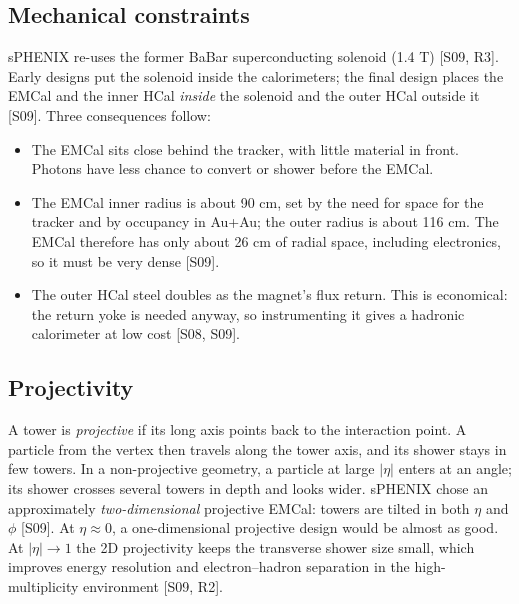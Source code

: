 \documentclass[11pt,letterpaper]{article}
\begin{document}
\subsection{Mechanical constraints}
sPHENIX re-uses the former BaBar superconducting solenoid (1.4 T) [S09, R3].
Early designs put the solenoid inside the calorimeters; the final design places the EMCal and the inner HCal \emph{inside} the solenoid and the outer HCal outside it [S09].
Three consequences follow:
\begin{itemize}
\item The EMCal sits close behind the tracker, with little material in front. Photons have less chance to convert or shower before the EMCal.
\item The EMCal inner radius is about 90 cm, set by the need for space for the tracker and by occupancy in Au+Au; the outer radius is about 116 cm. The EMCal therefore has only about 26 cm of radial space, including electronics, so it must be very dense [S09].
\item The outer HCal steel doubles as the magnet's flux return. This is economical: the return yoke is needed anyway, so instrumenting it gives a hadronic calorimeter at low cost [S08, S09].
\end{itemize}

\subsection{Projectivity}
A tower is \emph{projective} if its long axis points back to the interaction point.
A particle from the vertex then travels along the tower axis, and its shower stays in few towers.
In a non-projective geometry, a particle at large $|\eta|$ enters at an angle; its shower crosses several towers in depth and looks wider.
sPHENIX chose an approximately \emph{two-dimensional} projective EMCal: towers are tilted in both $\eta$ and $\phi$ [S09].
At $\eta\approx 0$, a one-dimensional projective design would be almost as good.
At $|\eta|\to1$ the 2D projectivity keeps the transverse shower size small, which improves energy resolution and electron--hadron separation in the high-multiplicity environment [S09, R2].
\end{document}
